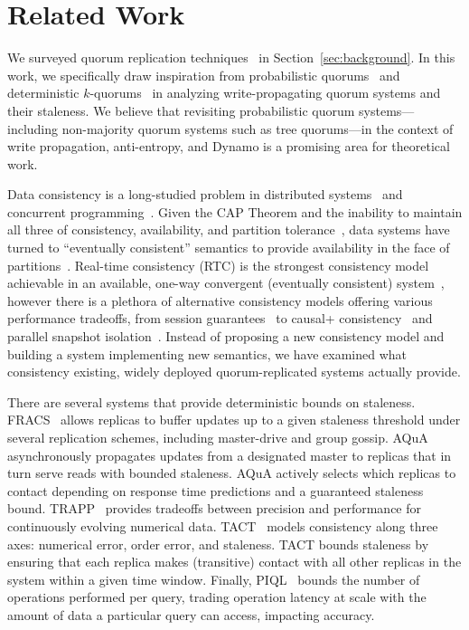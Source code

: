 \documentclass{vldb}
\newcommand{\sectionskip}{-0em}
\begin{document}
\vspace{\sectionskip}\section{Related Work}
\label{sec:relatedwork}

We surveyed quorum replication
techniques~\cite{prob-quorum-dynamic, treequorum,non-strict,
  multi-k-quorum, quorums-start, quorum-placement, partitionedquorum, quorums-alternative, prob-quorum,
  quorum-overview, quorumsystems} in Section~\ref{sec:background}.  In
this work, we specifically draw inspiration from probabilistic
quorums~\cite{prob-quorum} and deterministic
$k$-quorums~\cite{ non-strict, multi-k-quorum} in analyzing
write-propagating quorum systems and their staleness.  We believe that
revisiting probabilistic quorum systems---including non-majority
quorum systems such as tree quorums---in the context of write
propagation, anti-entropy, and Dynamo is a promising area for theoretical
work.

Data consistency is a long-studied problem in distributed
systems~\cite{consistency-partitioned, danger-rep} and concurrent
programming~\cite{linearizability}.  Given the CAP Theorem and the
inability to maintain all three of consistency, availability, and
partition tolerance~\cite{cap-proof}, data systems have turned to
``eventually consistent'' semantics to provide availability in the
face of partitions~\cite{consistency-partitioning, vogels-defs}.
Real-time consistency (RTC) is the strongest consistency model
achievable in an available, one-way convergent (eventually consistent)
system~\cite{rtc-proof}, however there is a plethora of alternative
consistency models offering various performance tradeoffs, from
session guarantees~\cite{sessionguarantees} to causal+
consistency~\cite{cops} and parallel snapshot isolation~\cite{walter}.
Instead of proposing a new consistency model and building a system
implementing new semantics, we have examined what consistency
existing, widely deployed quorum-replicated systems actually provide.

There are several systems that provide deterministic bounds on
staleness.  FRACS~\cite{frac} allows replicas to buffer updates up to
a given staleness threshold under several replication schemes,
including master-drive and group gossip.  AQuA~\cite{aqua}
asynchronously propagates updates from a designated master to replicas
that in turn serve reads with bounded staleness.  AQuA actively
selects which replicas to contact depending on response time
predictions and a guaranteed staleness bound.  TRAPP~\cite{trapp}
provides tradeoffs between precision and performance for continuously
evolving numerical data.  TACT~\cite{vahdat-article, vahdat-bounded}
models consistency along three axes: numerical error, order error, and
staleness.  TACT bounds staleness by ensuring that each replica makes
(transitive) contact with all other replicas in the system within a
given time window.  Finally, PIQL~\cite{piql} bounds the number of
operations performed per query, trading operation latency at scale
with the amount of data a particular query can access, impacting
accuracy.
\end{document}
